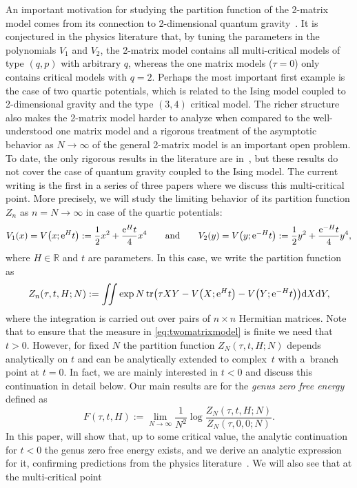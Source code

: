 \documentclass[10pt,a4paper]{amsart}
\DeclareMathOperator{\tr}{tr}
\numberwithin{equation}{section}
\begin{document}
An important motivation for studying the partition function of the 2-matrix model comes from its connection to 2-dimensional quantum gravity~\cite{KB,DS,GM1,GM2}. It is conjectured in the physics literature that, by tuning the parameters in the polynomials $V_1$ and $V_2$, the 2-matrix model contains all multi-critical models of type $(q,p)$ with arbitrary $q$, whereas the one matrix models ($\tau=0$) only contains critical models with $q=2$. Perhaps the most important first example is the case of two quartic potentials, which is related to the Ising model coupled to 2-dimensional gravity and the type $(3,4)$ critical model. The richer structure also makes the 2-matrix model harder to analyze when compared to the well-understood one matrix model and a rigorous treatment of the asymptotic behavior as $N\to \infty$ of the general 2-matrix model is an important open problem. To date, the only rigorous results in the literature are in~\cite{DG,DK1,DKM}, but these results do not cover the case of quantum gravity coupled to the Ising model. The current writing is the first in a series of three papers where we discuss this multi-critical point. More precisely, we will study the limiting behavior of its partition function $Z_n$ as $n=N \to \infty$ in case of the quartic potentials:
\[
V_1(x) = V\bigl(x;{\rm e}^H t\bigr):=\frac12 x^2 + \frac{{\rm e}^H t}{4} x^4 \qquad \text{and} \qquad V_2(y)=V\bigl(y;{\rm e}^{-H} t\bigr):=\frac12 y^2 + \frac{{\rm e}^{-H} t}{4} y^4,
\]
where $H \in \mathbb R $ and $t$ are parameters. In this case, we write the partition function as
 \begin{equation*}
 Z_n(\tau,t,H;N) := \iint \exp N \tr \bigl(\tau X Y- V\bigl(X;{\rm e}^H t\bigr) -V\bigl(Y;{\rm e}^{-H} t\bigr)\bigr) {\rm d}X {\rm d}Y,
 \end{equation*}
where the integration is carried out over pairs of $n\times n$ Hermitian matrices.
Note that to ensure that the measure in \eqref{eq:twomatrixmodel} is finite we need that $t>0$. However, for fixed $N$ the partition function $Z_N(\tau,t,H;N)$ depends analytically on $t$ and can be analytically extended to complex~$t$ with a~branch point at $t=0$. In fact, we are mainly interested in $t<0$ and discuss this continuation in detail below.
Our main results are for the \textit{genus zero free energy} defined as
 \begin{equation}\label{free-energy-2-matrix-model}
 F(\tau,t,H) := \lim_{N\to \infty} \frac{1}{N^2} \log \frac{Z_{N}(\tau,t,H;N)}{Z_{N}(\tau,0,0;N)}.
 \end{equation}
In this paper, will show that, up to some critical value, the analytic continuation for $t<0$ the genus zero free energy exists, and we derive an analytic expression for it, confirming predictions from the physics literature~\cite{Kazakov2, Kazakov1}. We will also see that at the multi-critical point
\end{document}
